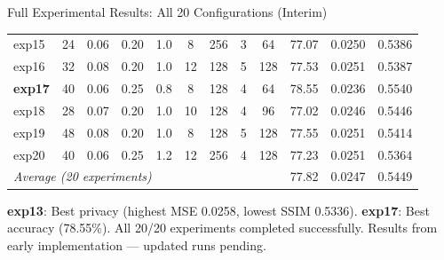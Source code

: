 \documentclass[aspectratio=169, 10pt]{beamer}
\begin{document}
\begin{frame}{Full Experimental Results: All 20 Configurations {\small\color{warnorg}(Interim)}}
\begin{center}
\begin{tabular}{l|cccc|cccc|ccc}
exp15 & 24 & 0.06 & 0.20 & 1.0 & 8 & 256 & 3 & 64 & 77.07 & 0.0250 & 0.5386 \\
exp16 & 32 & 0.08 & 0.20 & 1.0 & 12 & 128 & 5 & 128 & 77.53 & 0.0251 & 0.5387 \\
\rowcolor{green!8}
\textbf{exp17} & 40 & 0.06 & 0.25 & 0.8 & 8 & 128 & 4 & 64 & 78.55 & 0.0236 & 0.5540 \\
exp18 & 28 & 0.07 & 0.20 & 1.0 & 10 & 128 & 4 & 96 & 77.02 & 0.0246 & 0.5446 \\
exp19 & 48 & 0.08 & 0.20 & 1.0 & 8 & 128 & 5 & 128 & 77.55 & 0.0251 & 0.5414 \\
exp20 & 40 & 0.06 & 0.25 & 1.2 & 12 & 256 & 4 & 128 & 77.23 & 0.0251 & 0.5364 \\
\midrule
\multicolumn{9}{l|}{\textit{Average (20 experiments)}} & 77.82 & 0.0247 & 0.5449 \\
\bottomrule
\end{tabular}
\end{center}

\vspace{0.05cm}
\scriptsize
\colorbox{yellow!12}{\textbf{exp13}}: Best privacy (highest MSE 0.0258, lowest SSIM 0.5336). \quad
\colorbox{green!8}{\textbf{exp17}}: Best accuracy (78.55\%). \quad
All 20/20 experiments completed successfully. {\color{warnorg}Results from early implementation --- updated runs pending.}

\end{frame}
\end{document}
